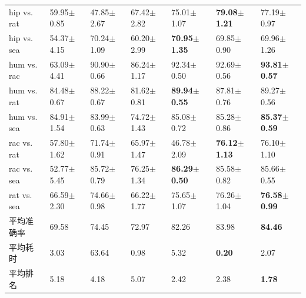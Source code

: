 \documentclass[twoside,zihao=-4,UTF8]{bjfu}
\begin{document}
{\begin{flushleft}
\begin{longtable}[h]{p{55pt}p{50pt}p{50pt}p{50pt}p{50pt}p{50pt}p{50pt}}
		hip vs. rat & 59.95$\pm$0.85 & 47.85$\pm$2.67 & 67.42$\pm$2.82 & 
		75.01$\pm$1.07 & \textbf{79.08$\pm$1.21} & 77.19$\pm$0.97 \\
		hip vs. sea & 54.37$\pm$4.15 & 70.24$\pm$1.09 & 60.20$\pm$2.99 & 
		\textbf{70.95$\pm$1.35} & 69.85$\pm$0.90 & 69.96$\pm$1.26 \\
		hum vs. rac & 63.09$\pm$4.41 & 90.90$\pm$0.66 & 86.24$\pm$1.17 & 
		92.34$\pm$0.50 & 92.69$\pm$0.56 & \textbf{93.81$\pm$0.57} \\
		hum vs. rat & 84.48$\pm$0.67 & 88.22$\pm$0.67 & 81.62$\pm$0.81 & 
		\textbf{89.94$\pm$0.55} & 87.81$\pm$0.76 & 89.27$\pm$0.56 \\
		hum vs. sea & 84.91$\pm$1.54 & 83.99$\pm$0.63 & 74.72$\pm$1.43 & 
		85.08$\pm$0.72 & 85.28$\pm$0.86 & \textbf{85.37$\pm$0.59} \\
		rac vs. rat & 57.80$\pm$1.62 & 71.74$\pm$0.91 & 65.97$\pm$1.47 & 
		46.78$\pm$2.09 & \textbf{76.12$\pm$1.13} & 76.10$\pm$1.10 \\
		rac vs. sea & 52.77$\pm$5.45 & 85.72$\pm$0.79 & 76.25$\pm$1.34 & 
		\textbf{86.29$\pm$0.50} & 85.58$\pm$0.82 & 85.66$\pm$0.55 \\
		rat vs. sea & 66.59$\pm$2.30 & 74.66$\pm$0.98 & 66.22$\pm$1.77 & 
		75.65$\pm$1.07 & 76.26$\pm$1.04 & \textbf{76.58$\pm$0.99} \\
		\midrule
		平均准确率 & 69.58 & 74.45 & 72.97 & 82.26 & 83.98 & \textbf{84.46} \\
		平均耗时 & 3.03  & 63.64 & 0.98 & 5.32 & \textbf{0.20} & 2.07 \\
		平均排名 & 5.18  & 4.18  & 5.07  & 2.42  & 2.38  & \textbf{1.78}
	\end{longtable}
\end{flushleft}}
\end{document}
